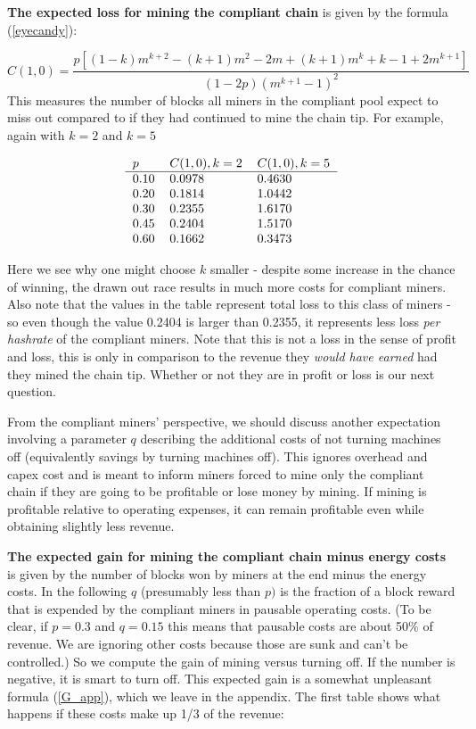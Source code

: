 \documentclass{article}%
\begin{document}
\textbf{The expected loss for mining the compliant chain} is given by the
formula (\ref{eyecandy}):%


\[ C(1,0)= \frac{ p\left[ (1-k)m^{k+2}-(k+1)m^{2}-2m+(k+1)m^{k}+k-1+2m^{k+1} \right] }{ (1-2p)\left(m^{k+1}-1\right)^{2} } \]
This measures the number of blocks all miners in the compliant pool expect to
miss out compared to if they had continued to mine the chain tip.  For
example, again with $k=2$ and $k=5$

\[ \begin{tabular}[c]{lll} $p$ & $C(1,0),k=2$ & $C(1,0),k=5$\\ \hline $0.10$ & $0.0978$ & $0.4630$\\ $0.20$ & $0.1814$ & $1.0442$\\ $0.30$ & $0.2355$ & $1.6170$\\ $0.45$ & $0.2404$ & $1.5170$\\ $0.60$ & $0.1662$ & $0.3473$ \end{tabular} \]

Here we see why one might choose $k$ smaller - despite some increase in the
chance of winning, the drawn out race results in much more costs for compliant
miners.  Also note that the values in the table represent total loss to this
class of miners - so even though the value 0.2404 is larger than 0.2355, it
represents less loss \textit{per hashrate} of the compliant miners. Note that
this is not a loss in the sense of profit and loss, this is only in comparison
to the revenue they \textit{would have earned} had they mined the chain tip.
 Whether or not they are in profit or loss is our next question.

From the compliant miners' perspective, we should discuss another expectation
involving a parameter $q$ describing the additional costs of not turning
machines off (equivalently savings by turning machines off). This ignores
overhead and capex cost and is meant to inform miners forced to mine only the
compliant chain if they are going to be profitable or lose money by mining.
 If mining is profitable relative to operating expenses, it can remain
profitable even while obtaining slightly less revenue.

\textbf{The expected gain for mining the compliant chain minus energy costs
}is given by the number of blocks won by miners at the end minus the energy
costs.  In the following $q$ (presumably less than $p)$ is the fraction of a
block reward that is expended by the compliant miners in pausable operating
costs. (To be clear, if $p=0.3$ and $q=0.15$ this means that pausable costs
are about 50\% of revenue.  We are ignoring other costs because those are
sunk and can't be controlled.) So we compute the gain of mining versus
turning off.  If the number is negative, it is smart to turn off.  This
expected gain is a  somewhat unpleasant formula  (\ref{G_app}), which we leave in the appendix.  The first table shows what happens if these costs make up
1/3 of the revenue:
\end{document}
